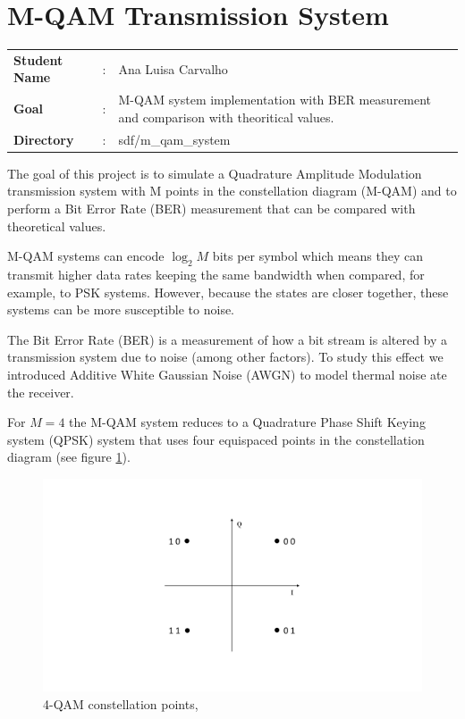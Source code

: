 \clearpage
\section{M-QAM Transmission System}

\begin{tcolorbox}	
	\begin{tabular}{p{2.75cm} p{0.2cm} p{10.5cm}} 	
		\textbf{Student Name}  &:& Ana Luisa Carvalho\\
		\textbf{Goal}          &:& M-QAM system implementation with BER measurement and comparison with theoritical values.\\
		\textbf{Directory} &:& sdf/m\_qam\_system
	\end{tabular}
\end{tcolorbox}

The goal of this project is to simulate a Quadrature Amplitude Modulation transmission system with M points in the constellation diagram (M-QAM) and to perform a Bit Error Rate (BER) measurement that can be compared with theoretical values. 

M-QAM systems can encode $\log_2 M$ bits per symbol which means they can transmit higher data rates keeping the same bandwidth when compared, for example, to PSK systems. However, because the states are closer together, these systems can be more susceptible to noise.

The Bit Error Rate (BER) is a measurement of how a bit stream is altered by a transmission system due to noise (among other factors). To study this effect we introduced Additive White Gaussian Noise (AWGN) to model thermal noise ate the receiver. 

For $M=4$ the M-QAM system reduces to a Quadrature Phase Shift Keying system (QPSK) system that uses four equispaced points in the constellation diagram (see figure \ref{fig:const}). 

\begin{figure}[h]
	\centering
	\includegraphics[clip, trim=1cm 3cm 1cm 3cm, width=\textwidth]{./sdf/m_qam_system/figures/MQAM_constellation.pdf}
	\caption{4-QAM constellation points,}
	\label{fig:const}
\end{figure}

